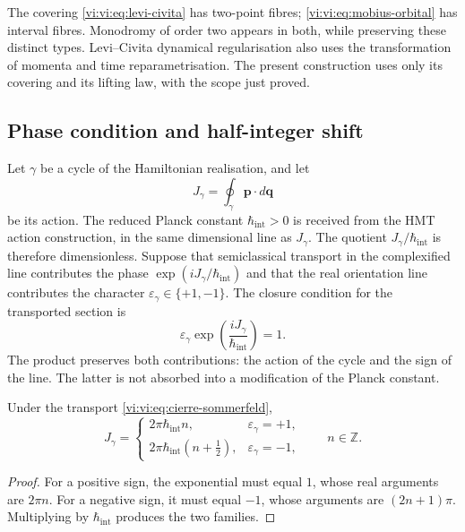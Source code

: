 The covering \eqref{vi:vi:eq:levi-civita} has two-point
fibres; \eqref{vi:vi:eq:mobius-orbital} has interval
fibres. Monodromy of order two appears in both,
while preserving these distinct types. Levi--Civita dynamical
regularisation also uses the transformation
of momenta and time reparametrisation. The present
construction uses only its covering and its lifting
law, with the scope just proved.

\subsection{Phase condition and half-integer shift}
\label{vi:vi:subsec:sommerfeld}

Let $\gamma$ be a cycle of the Hamiltonian realisation, and let
\begin{equation}
 J_\gamma=\oint_\gamma\mathbf p\cdot d\mathbf q
 \label{vi:vi:eq:accion-ciclo}
\end{equation}
be its action. The reduced Planck constant
$\hbar_{\mathrm{int}}>0$ is received from the HMT
action construction, in the same dimensional line as $J_\gamma$.
The quotient $J_\gamma/\hbar_{\mathrm{int}}$ is therefore
dimensionless. Suppose that semiclassical transport in the
complexified line contributes the phase
$\exp(iJ_\gamma/\hbar_{\mathrm{int}})$ and that the real
orientation line contributes the character
$\varepsilon_\gamma\in\{+1,-1\}$. The closure condition
for the transported section is
\begin{equation}
 \varepsilon_\gamma
       \exp\!\left(\frac{iJ_\gamma}{\hbar_{\mathrm{int}}}\right)=1.
 \label{vi:vi:eq:cierre-sommerfeld}
\end{equation}
The product preserves both contributions: the action of the
cycle and the sign of the line. The latter is not absorbed into a
modification of the Planck constant.

\begin{theorem}
\label{vi:vi:thm:sommerfeld}
Under the transport \eqref{vi:vi:eq:cierre-sommerfeld},
\begin{equation}
 J_\gamma=
 \begin{cases}
  2\pi\hbar_{\mathrm{int}}n,
          &\varepsilon_\gamma=+1,\\[1mm]
  2\pi\hbar_{\mathrm{int}}(n+\tfrac12),
          &\varepsilon_\gamma=-1,
 \end{cases}
 \qquad n\in\mathbb Z.
 \label{vi:vi:eq:accion-sommerfeld}
\end{equation}
\end{theorem}
\begin{proof}
For a positive sign, the exponential must equal $1$, whose
real arguments are $2\pi n$. For a negative sign, it must
equal $-1$, whose arguments are $(2n+1)\pi$. Multiplying
by $\hbar_{\mathrm{int}}$ produces the two families.
\end{proof}

